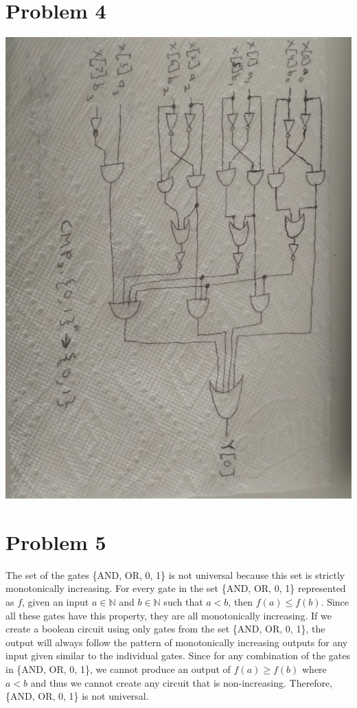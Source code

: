 \documentclass[12pt]{article}
\begin{document}
\newpage
\section*{Problem 4}
\includegraphics[scale=0.15, angle=-90]{problem4.jpg}

\newpage
\section*{Problem 5}
The set of the gates \{AND, OR, 0, 1\} is not universal because this set is strictly monotonically increasing.
For every gate in the set \{AND, OR, 0, 1\} represented as $f$, given an input $a\in \mathbb{N}$ and $b\in \mathbb{N}$ 
such that $a < b$, then $f(a) \leq f(b)$. Since all these gates have this property, they are all monotonically increasing.
If we create a boolean circuit using only gates from the set \{AND, OR, 0, 1\}, the output will always
follow the pattern of monotonically increasing outputs for any input given similar to the individual gates. 
Since for any combination of the gates in \{AND, OR, 0, 1\}, we cannot produce an output of $f(a) \geq f(b)$ where
$a < b$ and thus we cannot create any circuit that is non-increasing. Therefore, \{AND, OR, 0, 1\} is not universal.
\end{document}
